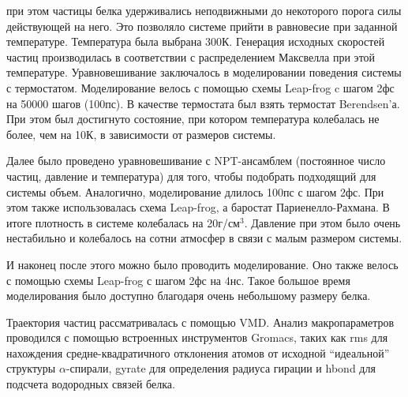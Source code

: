 \documentclass[
11pt,%
tightenlines,%
twoside,%
onecolumn,%
nofloats,%
nobibnotes,%
nofootinbib,%
superscriptaddress,%
noshowpacs,%
centertags]%
{revtex4}
\begin{document}
при этом частицы белка удерживались неподвижными до некоторого порога силы действующей на него.
Это позволяло системе прийти в равновесие при заданной температуре. 
Температура была выбрана 300К. 
Генерация исходных скоростей частиц производилась в соответствии с распределением Максвелла при этой температуре.
Уравновешивание заключалось в моделировании поведения системы с термостатом.
Моделирование велось с помощью схемы Leap-frog c шагом 2фс на 50000 шагов (100пс).
В качестве термостата был взять термостат Berendsen'а.
При этом был достигнуто состояние, при котором температура колебалась не более, чем на 10К,
в зависимости от размеров системы. \par
Далее было проведено уравновешивание с NPT-ансамблем (постоянное число частиц, давление и температура)
для того, чтобы подобрать подходящий для системы объем. 
Аналогично, моделирование длилось 100пс с шагом 2фс.
При этом также использовалась схема Leap-frog, а баростат Париенелло-Рахмана.
В итоге плотность в системе колебалась на 20г/см$^3$. 
Давление при этом было очень нестабильно и колебалось на сотни атмосфер в связи с малым размером системы. \par
И наконец после этого можно было проводить моделирование. 
Оно также велось с помощью схемы  Leap-frog с шагом 2фс на 4нс. 
Такое большое время моделирования было доступно благодаря очень небольшому размеру белка. \par
Траектория частиц рассматривалась с помощью VMD. 
Анализ макропараметров проводился с помощью встроенных инструментов Gromacs, 
таких как rms для нахождения средне-квадратичного отклонения атомов от исходной ``идеальной'' структуры $\alpha$-спирали, gyrate для определения радиуса гирации и hbond для подсчета водородных связей белка.
\end{document}
